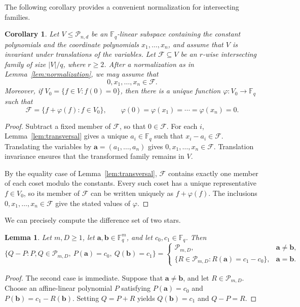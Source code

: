 \documentclass[12pt,reqno]{amsart}
\newtheorem{lem}[thm]{Lemma}
\newtheorem{cor}[thm]{Corollary}
\theoremstyle{definition}
\newcommand{\F}{\mathbb{F}}
\newcommand{\cF}{\mathcal F}
\newcommand{\cP}{\mathcal P}
\begin{document}
The following corollary provides a convenient normalization for intersecting families.

\begin{cor}\label{cor:standard-normalization}
Let $V\leq\cP_{n,d}$ be an $\F_q$-linear subspace containing the
constant polynomials and the coordinate polynomials $x_1,\ldots,x_n$, and assume
that $V$ is invariant under translations of the variables. Let
$\cF\subseteq V$ be an $r$-wise intersecting family of size $|V|/q$,
where $r\geq2$. After a normalization as in
Lemma~\ref{lem:normalization}, we may assume that
\[
  0,x_1,\ldots,x_n\in\cF.
\]
Moreover, if $V_0=\{f\in V:f(0)=0\}$, then there is a unique function
$\varphi\colon V_0\to\F_q$ such that
\[
\cF=\{f+\varphi(f):f\in V_0\}, \qquad \varphi(0)=\varphi(x_1)=\cdots=\varphi(x_n)=0.
\]
\end{cor}

\begin{proof}
Subtract a fixed member of $\cF$, so that $0\in\cF$. For each $i$,
Lemma~\ref{lem:transversal} gives a unique $a_i\in\F_q$ such that
$x_i-a_i\in\cF$. Translating the variables by
$\mathbf a=(a_1,\ldots,a_n)$ gives
$0,x_1,\ldots,x_n\in\cF$. Translation invariance ensures that the
transformed family remains in $V$.

By the equality case of Lemma~\ref{lem:transversal}, $\cF$ contains exactly one member of each coset modulo the constants. Every such coset has a unique representative $f\in V_0$, so its member of $\cF$ can be written uniquely as $f+\varphi(f)$. The inclusions $0,x_1,\ldots,x_n\in\cF$ give the stated values of $\varphi$.
\end{proof}

We can precisely compute the difference set of two stars.

\begin{lem}\label{lem:difference-of-stars}
Let $m,D\geq1$, let $\mathbf a,\mathbf b\in \F_q^m$, and let
$c_0,c_1\in \F_q$. Then
\[
 \{Q-P:P,Q\in\cP_{m,D},\ P(\mathbf a)=c_0,\ Q(\mathbf b)=c_1\}
 =
 \begin{cases}
   \cP_{m,D},&\mathbf a\neq\mathbf b,\\[1mm]
   \{R\in\cP_{m,D}:R(\mathbf a)=c_1-c_0\},
      &\mathbf a=\mathbf b.
 \end{cases}
\]
\end{lem}

\begin{proof}
The second case is immediate. Suppose that $\mathbf a\neq\mathbf b$, and let $R\in\cP_{m,D}$. Choose an affine-linear polynomial $P$ satisfying $P(\mathbf{a})=c_0$ and  $P(\mathbf{b})=c_1-R(\mathbf b)$. Setting $Q=P+R$ yields $Q(\mathbf b)=c_1$ and $Q-P=R$.
\end{proof}
\end{document}
